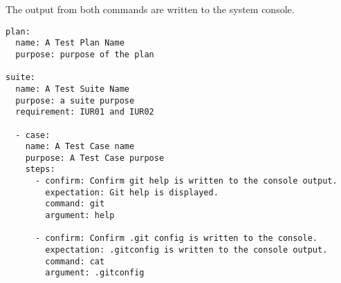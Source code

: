 The output from both commands are written to the system console.

\begin{lstlisting}
plan:
  name: A Test Plan Name
  purpose: purpose of the plan

suite:
  name: A Test Suite Name
  purpose: a suite purpose
  requirement: IUR01 and IUR02

  - case:
    name: A Test Case name
    purpose: A Test Case purpose
    steps:
      - confirm: Confirm git help is written to the console output.
        expectation: Git help is displayed.
        command: git
        argument: help

      - confirm: Confirm .git config is written to the console.
        expectation: .gitconfig is written to the console output.
        command: cat
        argument: .gitconfig
\end{lstlisting}
